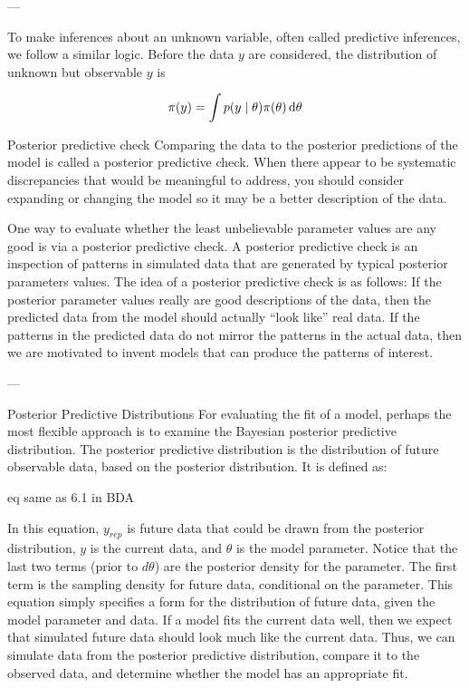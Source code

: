 ---

To make inferences about an unknown variable, often called predictive inferences, we follow a similar logic. Before the data $y$ are considered, the distribution of unknown but observable $y$ is 

\begin{equation}\label{eq:prior_predictive}
    \pi (y) = \int p \qty(y \mid \theta) \pi \qty(\theta) \dd{\theta}
\end{equation}


Posterior predictive check
Comparing the data to the posterior predictions of the model is called a posterior predictive check. When there appear to be systematic discrepancies that would be meaningful to address, you should consider expanding or changing the model so it may be a better description of the data.

One way to evaluate whether the least unbelievable parameter values are any good is via a posterior predictive check. A posterior predictive check is an inspection of patterns in simulated data that are generated by typical posterior parameters values. The idea of a posterior predictive check is as follows: If the posterior parameter values really are good descriptions of the data, then the predicted data from the model should actually “look like” real data. If the patterns in the predicted data do not mirror the patterns in the actual data, then we are motivated to invent models that can produce the patterns of interest.

---

Posterior Predictive Distributions
For evaluating the fit of a model, perhaps the most flexible approach is to examine the Bayesian posterior predictive distribution. The posterior predictive distribution is the distribution of future observable data, based on the posterior distribution. It is defined as: 

eq same as 6.1 in BDA 

In this equation, $y_{rep}$ is future data that could be drawn from the posterior distribution, $y$ is the current data, and $\theta$ is the model parameter. Notice that the last two terms (prior to $d\theta$) are the posterior density for the parameter. The first term is the sampling density for future data, conditional on the parameter. This equation simply specifies a form for the distribution of future data, given the model parameter and data. If a model fits the current data well, then we expect that simulated future data should look much like the current data. Thus, we can simulate data from the posterior predictive distribution, compare it to the observed data, and determine whether the model has an appropriate fit. 

